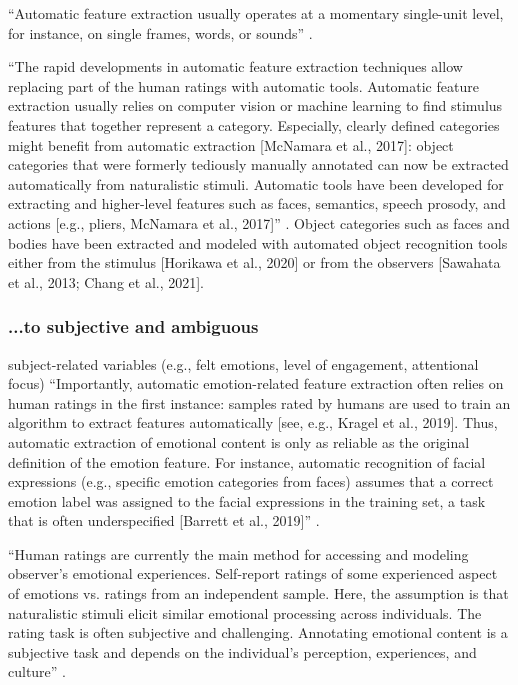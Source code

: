 %
``Automatic feature extraction usually operates at a momentary single-unit
level, for instance, on single frames, words, or sounds''
\citep{saarimaki2021naturalistic}.


``The rapid developments in automatic feature extraction techniques allow
replacing part of the human ratings with automatic tools.
%
Automatic feature extraction usually relies on computer vision or machine
learning to find stimulus features that together represent a category.
%
Especially, clearly defined categories might benefit from automatic extraction
[McNamara et al., 2017]:
%
object categories that were formerly tediously manually annotated can now be
extracted automatically from naturalistic stimuli.
%
Automatic tools have been developed for extracting and higher-level features
such as faces, semantics, speech prosody, and actions [e.g., pliers, McNamara et
al., 2017]'' \citep{saarimaki2021naturalistic}.
%
Object categories such as faces and bodies have been extracted and modeled with
automated object recognition tools either from the stimulus [Horikawa et al.,
2020] or from the observers [Sawahata et al., 2013; Chang et al., 2021].


\subsubsection{...to subjective and ambiguous}

subject-related variables (e.g., felt emotions, level of engagement, attentional
focus)
%
``Importantly, automatic emotion-related feature extraction often relies on
human ratings in the first instance:
%
samples rated by humans are used to train an algorithm to extract features
automatically [see, e.g., Kragel et al., 2019].
%
Thus, automatic extraction of emotional content is only as reliable as the
original definition of the emotion feature.
%
For instance, automatic recognition of facial expressions (e.g., specific
emotion categories from faces) assumes that a correct emotion label was assigned
to the facial expressions in the training set, a task that is often
underspecified [Barrett et al., 2019]'' \citep{saarimaki2021naturalistic}.

%
``Human ratings are currently the main method for accessing and modeling
observer’s emotional experiences.
%
Self-report ratings of some experienced aspect of emotions vs. ratings from an
independent sample.
%
Here, the assumption is that naturalistic stimuli elicit similar emotional
processing across individuals.
%
The rating task is often subjective and challenging.
%
Annotating emotional content is a subjective task and depends on the
individual’s perception, experiences, and culture''
\citep{saarimaki2021naturalistic}.



